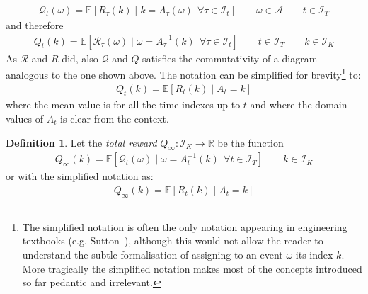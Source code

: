 \documentclass[]{scrartcl}
\theoremstyle{definition}
\newtheorem{definition}{Definition}[section]
\begin{document}
\begin{align}\label{def:mathcalQt}
\mathcal{Q}_t(\omega) = \mathbb{E} \left[ R_{\tau}(k)\mid k = A_{\tau}(\omega)~~ \forall \tau \in \mathcal{I}_t \right]
\qquad
\omega \in \mathcal{A}
\qquad
t \in \mathcal{I}_T
\end{align}
and therefore
\begin{align}\label{def:Qt}
Q_t(k) = \mathbb{E} \left[ \mathcal{R}_{\tau}(\omega)\mid \omega = A_{\tau}^{-1}(k)~~ \forall \tau \in \mathcal{I}_t \right]
\qquad
t \in \mathcal{I}_T
\qquad
k \in \mathcal{I}_K
\end{align}
As $\mathcal{R}$ and $R$ did, also $\mathcal{Q}$ and $Q$ satisfies the commutativity of a diagram analogous to the one shown above. The notation can be simplified for brevity\footnote{
    The simplified notation is often the only notation appearing in engineering textbooks (e.g. Sutton~\cite{sutton2018reinforcement}), although this would not allow the reader to understand the subtle formalisation of assigning to an event $\omega$ its index $k$. More tragically the simplified notation makes most of the concepts introduced so far pedantic and irrelevant.
} to:
\begin{align}\label{def:mathcalQt_simple}
Q_t(k) = \mathbb{E} \left[ R_{t}(k) \mid A_{t} = k \right]
\end{align}
where the mean value is for all the time indexes up to $t$ and where the domain values of $A_t$ is clear from the context.

\begin{definition}
    Let the \emph{total reward} $Q_{\infty}: \mathcal{I}_K \rightarrow \mathbb{R}$ be the function
    \begin{align}\label{def:mathcalQinf}
    Q_{\infty}(k) = \mathbb{E} \left[ \mathcal{Q}_{t}(\omega) \mid \omega = A^{-1}_{t}(k)~~ \forall t \in \mathcal{I}_T \right]
    \qquad
    k \in \mathcal{I}_K
    \end{align}
    or with the simplified notation as:
    \begin{align}\label{def:mathcalQinf_simple}
    Q_{\infty}(k) = \mathbb{E} \left[ R_{t}(k) \mid A_{t} = k \right]
    \end{align}
\end{definition}
\end{document}
